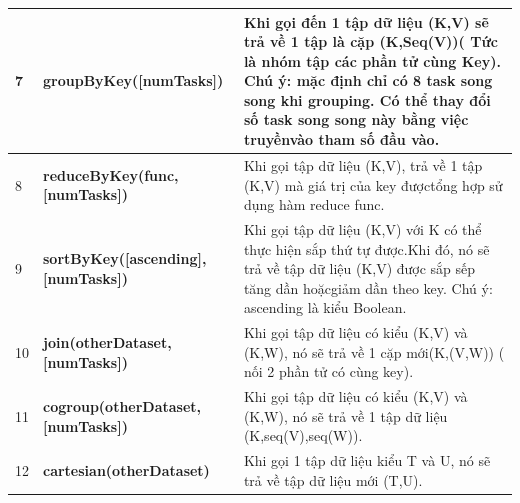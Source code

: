 \begin{table}[H]
\begin{tabular}{p{1cm}p{5cm}p{10cm}}
		7            & \textbf{groupByKey({[}numTasks{]})}                 & Khi gọi đến 1 tập dữ liệu (K,V) sẽ trả về 1 tập là cặp (K,Seq(V))( Tức là nhóm tập các phần tử cùng Key). Chú ý: mặc định chỉ có 8 task song song khi grouping. Có thể thay đổi số task song song này bằng việc truyềnvào tham số đầu vào. \\ \midrule
		8            & \textbf{reduceByKey(func, {[}numTasks{]})}          & Khi gọi tập dữ liệu (K,V), trả về 1 tập (K,V) mà giá trị của key đượctổng hợp sử dụng hàm reduce func.                                                                                                                                     \\ \midrule
		9            & \textbf{sortByKey({[}ascending{]}, {[}numTasks{]})} & Khi gọi tập dữ liệu (K,V) với K có thể thực hiện sắp thứ tự được.Khi đó, nó sẽ trả về tập dữ liệu (K,V) được sắp sếp tăng dần hoặcgiảm dần theo key. Chú ý: ascending là kiểu Boolean.                                                     \\ \midrule
		10           & \textbf{join(otherDataset, {[}numTasks{]})}         & Khi gọi tập dữ liệu có kiểu (K,V) và (K,W), nó sẽ trả về 1 cặp mới(K,(V,W)) ( nối 2 phần tử có cùng key).                                                                                                                                  \\ \midrule
		11           & \textbf{cogroup(otherDataset, {[}numTasks{]})}      & Khi gọi tập dữ liệu có kiểu (K,V) và (K,W), nó sẽ trả về 1 tập dữ liệu (K,seq(V),seq(W)).                                                                                                                                                  \\ \midrule
		12           & \textbf{cartesian(otherDataset)}                    & Khi gọi 1 tập dữ liệu kiểu T và U, nó sẽ trả về tập dữ liệu mới (T,U).                                                                                                                                                                     \\ \bottomrule
	\end{tabular}
\end{table}

